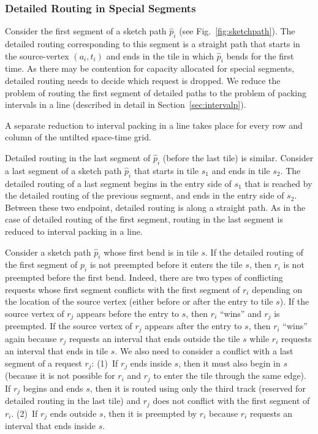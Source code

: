 \documentclass[11pt]{article}
\newenvironment{proof sketch}[1]{\noindent {\emph{Proof sketch of #1:}}}{\hfill \qed}
\begin{document}
\begin{comment}
  \bigskip
  \noindent
  We now elaborate on the detailed routing of every part, i.e.,
  special segments, internal segments and the last tile. We also
  elaborate on the transition between parts.
\end{comment}

\subsubsection{Detailed Routing in Special Segments}\label{sec:first detailed}
Consider the first segment of a sketch path $\hat{p}_i$ (see
Fig.~\ref{fig:sketchpath}).  The detailed routing corresponding to this segment is a
straight path that starts in the source-vertex $(a_i,t_i)$ and ends in the tile in
which $\hat{p}_i$ bends for the first time. As there may be contention for capacity
allocated for special segments, detailed routing needs to decide which request is
dropped. We reduce the problem of routing the first segment of detailed paths to the
problem of packing intervals in a line (described in detail in
Section~\ref{sec:intervalp}).

A separate reduction to interval packing in a line takes place for every row and column of the
untilted space-time grid.

Detailed routing in the last segment of $\hat{p}_i$ (before the last tile) is similar.
Consider a last segment of a sketch path $\hat{p}_i$ that starts in tile $s_1$ and
ends in tile $s_2$.  The detailed routing of a last segment
begins in the entry side of $s_1$ that is reached by the detailed routing of
the previous segment, and ends in the entry side of $s_2$. Between these two
endpoint, detailed routing is along a straight path. As in the case of detailed
routing of the first segment, routing in the last segment is reduced to interval
packing in a line.

Consider a sketch path $\hat p_i$ whose first bend is in tile $s$.  If the detailed
routing of the first segment of $p_i$ is not preempted before it enters the tile $s$,
then $r_i$ is not preempted before the first bend. Indeed, there are two types of
conflicting requests whose first segment conflicts with the first segment of $r_i$
depending on the location of the source vertex (either before or after the entry to
tile $s$). If the source vertex of $r_j$ appears before the entry to $s$, then $r_i$
``wins'' and $r_j$ is preempted. If the source vertex of $r_j$ appears after the entry
to $s$, then $r_i$ ``wins'' again because $r_j$ requests an interval that ends
outside the tile $s$ while $r_i$ requests an interval that ends in tile $s$. We also
need to consider a conflict with a last segment of a request $r_j$: (1)~If $r_j$ ends
inside $s$, then it must also begin in $s$ (because it is not possible for $r_i$ and
$r_j$ to enter the tile through the same edge). If $r_j$ begins and ends $s$, then it
is routed using only the third track (reserved for detailed routing in the last tile)
and $r_j$ does not conflict with the first segment of $r_i$. (2)~If $r_j$ ends outside
$s$, then it is preempted by $r_i$ because $r_i$ requests an interval that ends
inside $s$.
\end{document}

